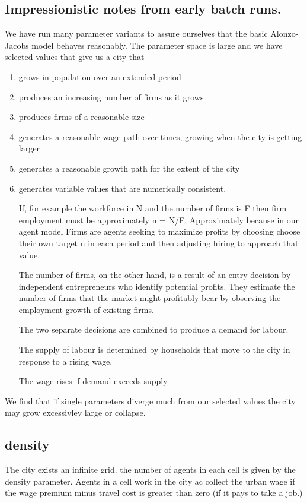 \subsection{Impressionistic notes from early batch runs.}
We have run many  parameter variants to assure ourselves that the basic Alonzo-Jacobs model behaves reasonably. The parameter space is large and we have selected values that give us a city that 
   \begin{enumerate}
   \item grows in population over an extended period 
   \item produces an increasing number of firms as it grows
   \item produces firms of a reasonable size
   \item generates a reasonable wage path over times, growing when the city is getting larger
   \item generates a reasonable growth path for the extent of the city
   \item generates variable values that are numerically consistent. 
   
   If, for example the workforce in N and the number of firms is F then firm employment must be approximately n = N/F. Approximately because in our agent model Firms are agents seeking to maximize profits by choosing choose their own target n in each period and then adjusting hiring to approach that value. 
   
   The number of firms, on the other hand, is a result of an entry decision by independent entrepreneurs who identify potential profits. They estimate the number of firms that the market might profitably  bear by observing the employment growth of existing firms. 

   The two separate decisions are combined to produce a demand for labour.
   
   The supply of labour is determined by households that move to the city in response to a rising wage.

   The wage rises if demand exceeds supply

   \end{enumerate}
We find that if single parameters  diverge much from our selected values the city may grow excessivley large or collapse.

\subsection{density}
The city exists an infinite grid. the number of agents in each cell is given by the density parameter. Agents in a cell work in the city ac collect the urban wage if the wage premium minus travel cost is greater than zero (if it pays to take a job.)

